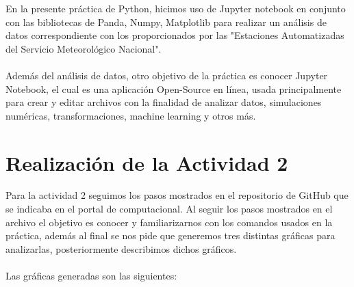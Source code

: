 En la presente práctica de Python, hicimos uso de Jupyter notebook en conjunto con las bibliotecas de Panda, Numpy, Matplotlib para realizar un análisis de datos correspondiente con los proporcionados por las "Estaciones Automatizadas del Servicio Meteorológico Nacional".
\\
\\ Además del análisis de datos, otro objetivo de la práctica es conocer Jupyter Notebook, el cual es una aplicación Open-Source en línea, usada principalmente para crear y editar archivos con la finalidad de analizar datos, simulaciones numéricas, transformaciones, machine learning y otros más. 

\section{Realización de la Actividad 2}
Para la actividad 2 seguimos los pasos mostrados en el repositorio de GitHub que se indicaba en el portal de computacional. Al seguir los pasos mostrados en el archivo el objetivo es conocer y familiarizarnos con los comandos usados en la práctica, además al final se nos pide que generemos tres distintas gráficas para analizarlas, posteriormente describimos dichos gráficos.
\\
\\ Las gráficas generadas son las siguientes:
